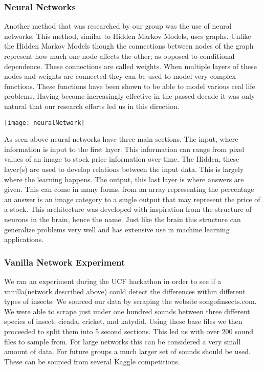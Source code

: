 \subsubsection{Neural Networks}
Another method that was researched by our group was the use of neural networks. This method, similar to Hidden Markov Models, uses graphs. Unlike the Hidden Markov Models though the connections between nodes of the graph represent how much one node affects the other; as opposed to conditional dependence. These connections are called weights. When multiple layers of these nodes and weights are connected they can be used to model very complex functions. These functions have been shown to be able to model various real life problems. Having become increasingly effective in the passed decade it was only natural that our research efforts led us in this direction.\par

\begin{center}
	\texttt{[image: neuralNetwork]}
\end{center}

As seen above neural networks have three main sections. The input, where information is input to the first layer. This information can range from pixel values of an image to stock price information over time. The Hidden, these layer(s) are used to develop relations between the input data. This is largely where the learning happens. The output, this last layer is where answers are given. This can come in many forms, from an array representing the percentage an answer is an image category to a single output that may represent the price of a stock. This architecture was developed with inspiration from the structure of neurons in the brain, hence the name. Just like the brain this structure can generalize problems very well and has extensive use in machine learning applications.\par

\subsubsection{Vanilla Network Experiment}
We ran an experiment during the UCF hackathon in order to see if a vanilla(network described above) could detect the differences within different types of insects. We sourced our data by scraping the website songofinsects.com. We were able to scrape just under one hundred sounds between three different species of insect; cicada, cricket, and katydid. Using these base files we then proceeded to split them into 5 second sections. This led us with over 200 sound files to sample from. For large networks this can be considered a very small amount of data. For future groups a much larger set of sounds should be used. These can be sourced from several Kaggle competitions.

